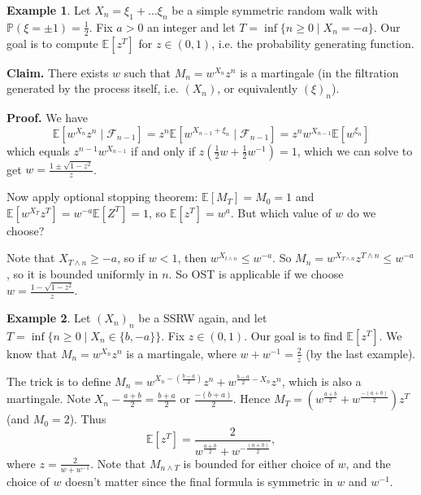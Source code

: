 \documentclass{article}
\theoremstyle{definition}
\newtheorem{example}{Example}[section]
\begin{document}
\begin{example}
    Let $X_n = \xi_1+\ldots \xi_n$ be a simple symmetric random walk with $\mathbb{P}(\xi = \pm 1)=\frac{1}{2}$. Fix $a>0$ an integer and let $T= \inf \{n\ge 0 \mid X_n=-a\}$. Our goal is to compute $\mathbb{E}[z^T]$ for $z \in (0,1)$, i.e. the probability generating function.
    \vspace{1mm}
    
    \textbf{Claim.} There exists $w$ such that $M_n = w^{X_n}z^n$ is a martingale (in the filtration generated by the process itself, i.e. $(X_n)$, or equivalently $(\xi)_n$).
    \vspace{1mm}
    
    \textbf{Proof.} We have
    $$\mathbb{E}[w^{X_n}z^n \mid \mathcal{F}_{n-1}] = z^n \mathbb{E}[w^{X_{n-1}+\xi_n} \mid \mathcal{F}_{n-1}] = z^n w^{X_{n-1}}\mathbb{E}[w^{\xi_n}]$$
    which equals $z^{n-1}w^{X_{n-1}}$ if and only if $z(\frac{1}{2}w + \frac{1}{2}w^{-1})=1$, which we can solve to get $w = \frac{1 \pm \sqrt{1-z^2}}{z}$.
    \vspace{1mm}
    
    Now apply optional stopping theorem: $\mathbb{E}[M_T]=M_0=1$ and $\mathbb{E}[w^{X_T}z^T]=w^{-a}\mathbb{E}[Z^T]=1$, so $\mathbb{E}[z^T]=w^a$. But which value of $w$ do we choose?
    \vspace{1mm}
    
    Note that $X_{T \wedge n}\ge -a$, so if $w<1$, then $w^{X_{t\wedge n}} \le w^{-a}$. So $M_n = w^{X_{T\wedge n}}z^{T \wedge n}\le w^{-a}$, so it is bounded uniformly in $n$. So OST is applicable if we choose $w=\frac{1-\sqrt{1-z^2}}{z}.$
\end{example}
\begin{example}
    Let $(X_n)_n$ be a SSRW again, and let $T=\inf \{n\ge 0 \mid X_n \in \{b,-a\}\}$. Fix $z \in (0,1)$. Our goal is to find $\mathbb{E}[z^T]$. We know that $M_n = w^{X_n}z^n$ is a martingale, where $w+w^{-1}=\frac{2}{z}$ (by the last example).
    \vspace{1mm}
    
    The trick is to define $M_n = w^{X_n-(\frac{b-a}{2})}z^n + w^{\frac{b-a}{2}-X_n}z^n$, which is also a martingale. Note $X_n - \frac{a+b}{2}= \frac{b+a}{2}$ or $\frac{-(b+a)}{2}$. Hence $M_T = (w^{\frac{a+b}{2}} + w^{\frac{-(a+b)}{2}})z^T$ (and $M_0=2$). Thus \[
        \mathbb{E}[z^T] = \frac{2}{w^{\frac{a+b}{2}}+w^{-\frac{(a+b)}{2}}},
    \]
    where $z=\frac{2}{w+w^{-1}}$. Note that $M_{n \wedge T}$ is bounded for either choice of $w$, and the choice of $w$ doesn't matter since the final formula is symmetric in $w$ and $w^{-1}$. 
\end{example}
\end{document}

